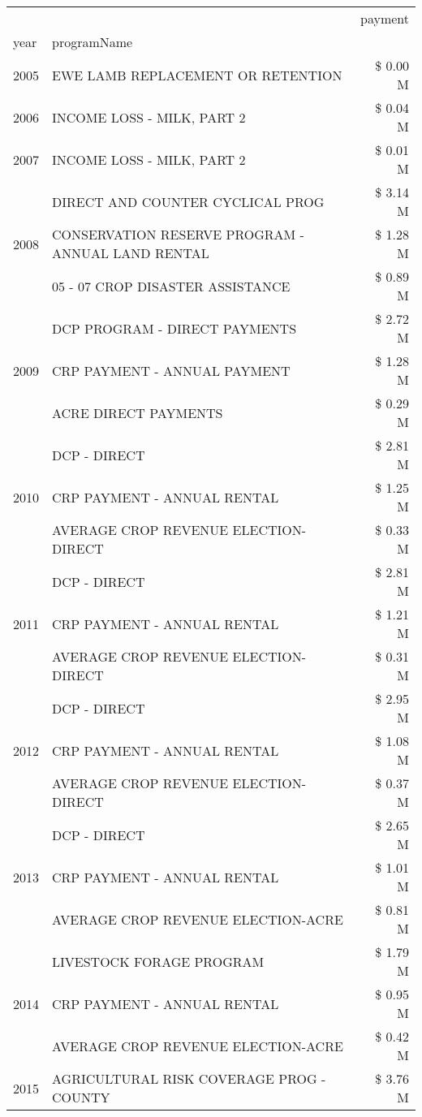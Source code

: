 \begin{tabular}{llr}
\toprule
 &  & payment \\
year & programName &  \\
\midrule
2005 & EWE LAMB REPLACEMENT OR RETENTION & \$ 0.00 M \\
\cline{1-3}
2006 & INCOME LOSS - MILK, PART 2 & \$ 0.04 M \\
\cline{1-3}
2007 & INCOME LOSS - MILK, PART 2 & \$ 0.01 M \\
\cline{1-3}
\multirow[t]{3}{*}{2008} & DIRECT AND COUNTER CYCLICAL PROG & \$ 3.14 M \\
 & CONSERVATION RESERVE PROGRAM - ANNUAL LAND RENTAL & \$ 1.28 M \\
 & 05 - 07 CROP DISASTER ASSISTANCE & \$ 0.89 M \\
\cline{1-3}
\multirow[t]{3}{*}{2009} & DCP PROGRAM - DIRECT PAYMENTS & \$ 2.72 M \\
 & CRP PAYMENT - ANNUAL PAYMENT & \$ 1.28 M \\
 & ACRE DIRECT PAYMENTS & \$ 0.29 M \\
\cline{1-3}
\multirow[t]{3}{*}{2010} & DCP - DIRECT & \$ 2.81 M \\
 & CRP PAYMENT - ANNUAL RENTAL & \$ 1.25 M \\
 & AVERAGE CROP REVENUE ELECTION-DIRECT & \$ 0.33 M \\
\cline{1-3}
\multirow[t]{3}{*}{2011} & DCP - DIRECT & \$ 2.81 M \\
 & CRP PAYMENT - ANNUAL RENTAL & \$ 1.21 M \\
 & AVERAGE CROP REVENUE ELECTION-DIRECT & \$ 0.31 M \\
\cline{1-3}
\multirow[t]{3}{*}{2012} & DCP - DIRECT & \$ 2.95 M \\
 & CRP PAYMENT - ANNUAL RENTAL & \$ 1.08 M \\
 & AVERAGE CROP REVENUE ELECTION-DIRECT & \$ 0.37 M \\
\cline{1-3}
\multirow[t]{3}{*}{2013} & DCP - DIRECT & \$ 2.65 M \\
 & CRP PAYMENT - ANNUAL RENTAL & \$ 1.01 M \\
 & AVERAGE CROP REVENUE ELECTION-ACRE & \$ 0.81 M \\
\cline{1-3}
\multirow[t]{3}{*}{2014} & LIVESTOCK FORAGE PROGRAM & \$ 1.79 M \\
 & CRP PAYMENT - ANNUAL RENTAL & \$ 0.95 M \\
 & AVERAGE CROP REVENUE ELECTION-ACRE & \$ 0.42 M \\
\cline{1-3}
\multirow[t]{3}{*}{2015} & AGRICULTURAL RISK COVERAGE PROG - COUNTY & \$ 3.76 M \\

\end{tabular}
